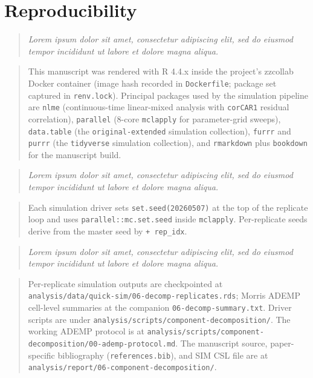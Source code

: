 \documentclass[
  11pt,
]{article}
\newenvironment{rgt}{%
  \begin{quote}\small\itshape\color[RGB]{20,60,160}}{%
  \end{quote}}
\newenvironment{orig}{%
  \begin{quote}\normalsize\color[gray]{0.55}}{%
  \end{quote}}
\begin{document}
\section{Reproducibility}\label{reproducibility}

\begin{rgt}
Lorem ipsum dolor sit amet, consectetur adipiscing elit, sed do eiusmod tempor incididunt ut labore et dolore magna aliqua.

\end{rgt}

\begin{orig}
This manuscript was rendered with R 4.4.x inside the project's
zzcollab Docker container (image hash recorded in
\texttt{Dockerfile}; package set captured in \texttt{renv.lock}).
Principal packages used by the simulation pipeline are
\texttt{nlme} (continuous-time linear-mixed analysis with
\texttt{corCAR1} residual correlation), \texttt{parallel}
(8-core \texttt{mclapply} for parameter-grid sweeps),
\texttt{data.table} (the \texttt{original-extended} simulation
collection), \texttt{furrr} and \texttt{purrr} (the
\texttt{tidyverse} simulation collection), and
\texttt{rmarkdown} plus \texttt{bookdown} for the manuscript
build.

\end{orig}

\begin{rgt}
Lorem ipsum dolor sit amet, consectetur adipiscing elit, sed do eiusmod tempor incididunt ut labore et dolore magna aliqua.

\end{rgt}

\begin{orig}
Each simulation driver sets \texttt{set.seed(20260507)} at the
top of the replicate loop and uses
\texttt{parallel::mc.set.seed} inside \texttt{mclapply}.
Per-replicate seeds derive from the master seed by
\texttt{+ rep\_idx}.

\end{orig}

\begin{rgt}
Lorem ipsum dolor sit amet, consectetur adipiscing elit, sed do eiusmod tempor incididunt ut labore et dolore magna aliqua.

\end{rgt}

\begin{orig}
Per-replicate simulation outputs are checkpointed at
\texttt{analysis/data/quick-sim/06-decomp-replicates.rds};
Morris ADEMP cell-level summaries at the companion
\texttt{06-decomp-summary.txt}. Driver scripts are under
\texttt{analysis/scripts/component-decomposition/}. The
working ADEMP protocol is at
\texttt{analysis/scripts/component-decomposition/00-ademp-protocol.md}.
The manuscript source, paper-specific bibliography
(\texttt{references.bib}), and SIM CSL file are at
\texttt{analysis/report/06-component-decomposition/}.

\end{orig}
\end{document}
